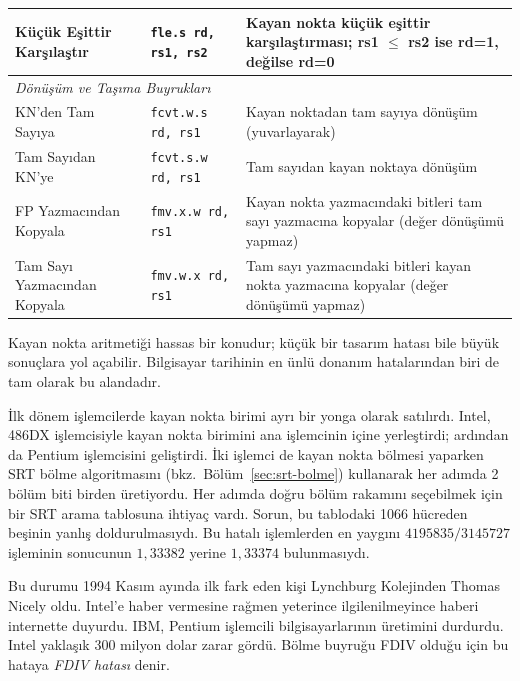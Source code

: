 \begin{table}[htbp]
\begin{tabularx}{\textwidth}{l l X}
Küçük Eşittir Karşılaştır & \texttt{fle.s rd, rs1, rs2} & Kayan nokta küçük eşittir karşılaştırması; rs1 $\leq$ rs2 ise rd=1, değilse rd=0 \\
\midrule
\multicolumn{3}{l}{\textit{Dönüşüm ve Taşıma Buyrukları}} \\
\midrule
KN'den Tam Sayıya & \texttt{fcvt.w.s rd, rs1} & Kayan noktadan tam sayıya dönüşüm (yuvarlayarak) \\
Tam Sayıdan KN'ye & \texttt{fcvt.s.w rd, rs1} & Tam sayıdan kayan noktaya dönüşüm \\
FP Yazmacından Kopyala & \texttt{fmv.x.w rd, rs1} & Kayan nokta yazmacındaki bitleri tam sayı yazmacına kopyalar (değer dönüşümü yapmaz) \\
Tam Sayı Yazmacından Kopyala & \texttt{fmv.w.x rd, rs1} & Tam sayı yazmacındaki bitleri kayan nokta yazmacına kopyalar (değer dönüşümü yapmaz) \\
\bottomrule
\end{tabularx}
\end{table}


\FloatBarrier
\begin{bilginot}
\label{sec:fdiv-hatasi}
Kayan nokta aritmetiği hassas bir konudur; küçük bir tasarım hatası bile büyük sonuçlara yol açabilir. Bilgisayar tarihinin en ünlü donanım hatalarından biri de tam olarak bu alandadır.

İlk dönem işlemcilerde kayan nokta birimi ayrı bir yonga olarak satılırdı. Intel, 486DX işlemcisiyle kayan nokta birimini ana işlemcinin içine yerleştirdi; ardından da Pentium işlemcisini geliştirdi. İki işlemci de kayan nokta bölmesi yaparken SRT bölme algoritmasını (bkz.~Bölüm~\ref{sec:srt-bolme}) kullanarak her adımda 2 bölüm biti birden üretiyordu. Her adımda doğru bölüm rakamını seçebilmek için bir SRT arama tablosuna ihtiyaç vardı. Sorun, bu tablodaki 1066 hücreden beşinin yanlış doldurulmasıydı. Bu hatalı işlemlerden en yaygını $4195835 / 3145727$ işleminin sonucunun $1{,}33382$ yerine $1{,}33374$ bulunmasıydı.

Bu durumu 1994 Kasım ayında ilk fark eden kişi Lynchburg Kolejinden Thomas Nicely oldu. Intel'e haber vermesine rağmen yeterince ilgilenilmeyince haberi internette duyurdu. IBM, Pentium işlemcili bilgisayarlarının üretimini durdurdu. Intel yaklaşık 300 milyon dolar zarar gördü. Bölme buyruğu FDIV olduğu için bu hataya \emph{FDIV hatası} denir.
\end{bilginot}

